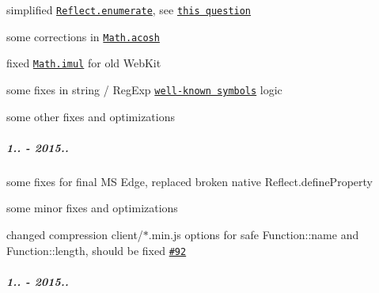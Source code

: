 \begin{DoxyItemize}
\item simplified \href{https://github.com/zloirock/core-js/#ecmascript-6-reflect}{\tt {\ttfamily Reflect.\+enumerate}}, see \href{https://esdiscuss.org/topic/question-about-enumerate-and-property-decision-timing}{\tt this question}
\item some corrections in \href{https://github.com/zloirock/core-js/#ecmascript-6-math}{\tt {\ttfamily Math.\+acosh}}
\item fixed \href{https://github.com/zloirock/core-js/#ecmascript-6-math}{\tt {\ttfamily Math.\+imul}} for old Web\+Kit
\item some fixes in string / Reg\+Exp \href{https://github.com/zloirock/core-js/#ecmascript-6-regexp}{\tt well-\/known symbols} logic
\item some other fixes and optimizations
\end{DoxyItemize}

\subparagraph*{1.. -\/ 2015..}


\begin{DoxyItemize}
\item some fixes for final MS Edge, replaced broken native {\ttfamily Reflect.\+define\+Property}
\item some minor fixes and optimizations
\item changed compression {\ttfamily client/$\ast$.min.\+js} options for safe {\ttfamily Function\+::name} and {\ttfamily Function\+::length}, should be fixed \href{https://github.com/zloirock/core-js/issues/92}{\tt \#92}
\end{DoxyItemize}

\subparagraph*{1.. -\/ 2015..}


